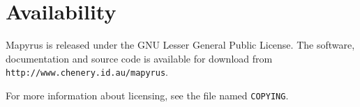 
\section{Availability}

Mapyrus is released under the GNU Lesser General Public License.
The software, documentation and source code is available for download
from \\
\texttt{http://www.chenery.id.au/mapyrus}.

For more information about licensing, see the file named \texttt{COPYING}.

